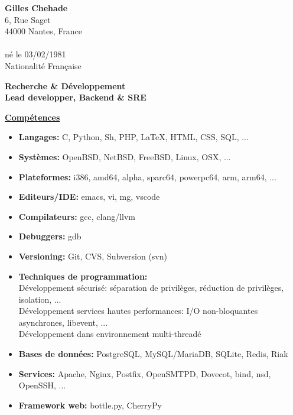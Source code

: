 \documentclass[a4paper,10pt]{letter}
\begin{document}
	\textbf{Gilles Chehade}\\
    6, Rue Saget\\
	44000 Nantes, France\\
	\\
	n\'e le 03/02/1981\\
	Nationalit\'e Fran\c caise\\

	\begin{center}
		\large
		\textbf {
			Recherche \& D\'eveloppement\\
            Lead developper, Backend \& SRE\\
		}
	\end{center}

	\normalsize

	\underline{\textbf{Comp\'etences}}\\
		\begin{itemize}
			\item	\textbf{Langages:}
			C, Python, Sh, PHP, \LaTeX, HTML, CSS, SQL, ...
			\item	\textbf{Syst\`emes:}
			OpenBSD, NetBSD, FreeBSD, Linux, OSX, ...
			\item	\textbf{Plateformes:}
			i386, amd64, alpha, sparc64, powerpc64, arm, arm64, ...
			\item	\textbf{Editeurs/IDE:}
			emacs, vi, mg, vscode
			\item	\textbf{Compilateurs:}
			gcc, clang/llvm
			\item	\textbf{Debuggers:}
			gdb
			\item	\textbf{Versioning:}
			Git, CVS, Subversion (svn)
			\item	\textbf{Techniques de programmation:}\\
			D\'eveloppement s\'ecuris\'e: s\'eparation de
			privil\`eges, r\'eduction de privil\`eges, isolation, ...\\
			D\'eveloppement services hautes performances:
			I/O non-bloquantes asynchrones, libevent, ...\\
			D\'eveloppement dans environnement multi-thread\'e
		    \item	\textbf{Bases de donn\'ees:}
			PostgreSQL, MySQL/MariaDB, SQLite, Redis, Riak
            \item	\textbf{Services:}
			Apache, Nginx, Postfix, OpenSMTPD, Dovecot, bind, nsd, OpenSSH, ...
        	\item	\textbf{Framework web:}
			bottle.py, CherryPy\\
		\end{itemize}
\end{document}
